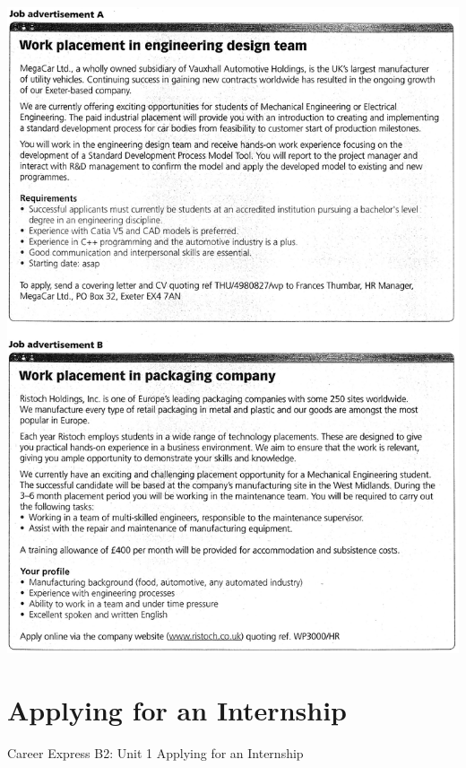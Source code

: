 \includegraphics[scale=.85]{handouts/Eng312.jpg}


\section{Applying for an Internship}
Career Express B2: Unit 1 Applying for an Internship

